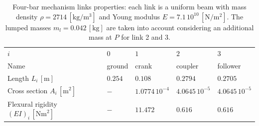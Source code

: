 \documentclass{svjour3}                     %
\begin{document}
	\begin{table}[bt]
		\caption{Four-bar mechanism links properties: each link is a uniform beam with mass density $\rho=2714\,[\mathrm{kg}/\mathrm{m}^3]$ and Young modulus $E=7.1\,10^{10}\,[\mathrm{N}/\mathrm{m}^2]$. The lumped masses $m_l=0.042\,[\mathrm{kg}]$ are taken into account considering an additional mass at $P$ for link 2 and 3.}
		\label{tab:data_4bars}       %
		\begin{tabular}{lllll}
			\hline\noalign{\smallskip}
			$i$ & $0$ &  $1$ &  $2$ &  $3$  \\
			\noalign{\smallskip}\hline\noalign{\smallskip}
			Name & ground & crank & coupler & follower \\ 
			Length $L_i\,[\mathrm{m}]$ & $0.254$ & $0.108$ & $0.2794$ & $0.2705$\\
			Cross section $A_i\,[\mathrm{m}^2]$ & $-$ & $1.0774\,10^{-4}$ & $4.0645\,10^{-5}$ & $4.0645\,10^{-5}$ \\
			Flexural rigidity $(EI)_i\,[\mathrm{Nm}^2]$ & $-$ & $11.472$ & $0.616$ & $0.616$ \\
			\hline
		\end{tabular}
	\end{table}
	
\end{document}

